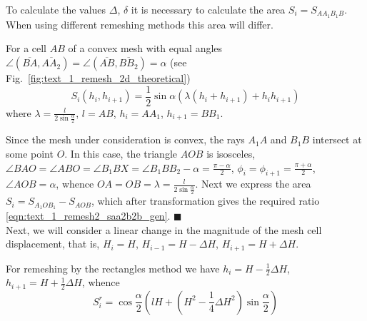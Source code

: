 \documentclass[
11pt,%
tightenlines,%
twoside,%
onecolumn,%
nofloats,%
nobibnotes,%
nofootinbib,%
superscriptaddress,%
noshowpacs,%
centertags]%
{revtex4}
\begin{document}
To calculate the values $\Delta$, $\delta$ it is necessary to calculate the area $S_i = S_{AA_1B_1B}$.
When using different remeshing methods this area will differ.

\begin{lemma}\label{lem:text_1_remesh2_vypukl_lemma}
For a cell $AB$ of a convex mesh with equal angles $\angle (\overline{BA}, \overline{AA_2}) = \angle (\overline{AB}, \overline{BB_2}) = \alpha$ (see Fig.~\ref{fig:text_1_remesh_2d_theoretical})
\begin{equation}\label{eqn:text_1_remesh2_saa2b2b_gen}
S_i(h_i, h_{i + 1}) = \frac{1}{2} \sin \alpha \left( \lambda(h_i + h_{i+1}) + h_ih_{i+1} \right)
\end{equation}
where $\lambda = \frac{l}{2 \sin \frac{\alpha}{2}}$, $l = AB$, $h_i = AA_1$, $h_{i + 1} = BB_1$.
\end{lemma}

Since the mesh under consideration is convex, the rays $A_1A$ and $B_1B$ intersect at some point $O$.
In this case, the triangle $AOB$ is isosceles, $\angle BAO = \angle ABO = \angle B_1BX = \angle B_1BB_2 - \alpha = \frac{\pi - \alpha}{2}$, $\phi_i = \phi_{i + 1} = \frac{\pi + \alpha}{2}$, $\angle AOB = \alpha$, whence $OA = OB = \lambda = \frac{l}{2 \sin \frac{\alpha}{2}}$.
Next we express the area $S_i = S_{A_1OB_1} - S_{AOB}$, which after transformation gives the required ratio \eqref{eqn:text_1_remesh2_saa2b2b_gen}.
$\blacksquare$\\

Next, we will consider a linear change in the magnitude of the mesh cell displacement, that is, $H_i = H$, $H_{i - 1} = H - \Delta H$, $H_{i + 1} = H + \Delta H$.

For remeshing by the rectangles method we have $h_i = H - \frac{1}{2} \Delta H$, $h_{i + 1} = H + \frac{1}{2} \Delta H$, whence
\begin{equation}\label{eqn:text_1_remesh2_s_rect}
	S_i^r = \cos \frac{\alpha}{2} \left( lH + \left( H^2 - \frac{1}{4} \Delta H^2 \right) \sin \frac{\alpha}{2} \right)
\end{equation}
\end{document}
